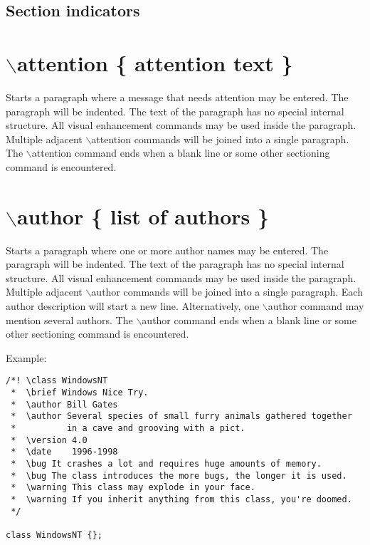 \subsection*{ Section indicators }



 \hypertarget{commands_cmdattention}{}\section{$\backslash$attention \{ attention text \}}\label{commands_cmdattention}
 Starts a paragraph where a message that needs attention may be entered. The paragraph will be indented. The text of the paragraph has no special internal structure. All visual enhancement commands may be used inside the paragraph. Multiple adjacent $\backslash$attention commands will be joined into a single paragraph. The $\backslash$attention command ends when a blank line or some other sectioning command is encountered.\hypertarget{commands_cmdauthor}{}\section{$\backslash$author \{ list of authors \}}\label{commands_cmdauthor}
 Starts a paragraph where one or more author names may be entered. The paragraph will be indented. The text of the paragraph has no special internal structure. All visual enhancement commands may be used inside the paragraph. Multiple adjacent $\backslash$author commands will be joined into a single paragraph. Each author description will start a new line. Alternatively, one $\backslash$author command may mention several authors. The $\backslash$author command ends when a blank line or some other sectioning command is encountered.

\begin{Desc}
\item[Example:]

\begin{VerbInclude}\begin{verbatim}/*! \class WindowsNT
 *  \brief Windows Nice Try.
 *  \author Bill Gates
 *  \author Several species of small furry animals gathered together 
 *          in a cave and grooving with a pict.
 *  \version 4.0
 *  \date    1996-1998
 *  \bug It crashes a lot and requires huge amounts of memory.
 *  \bug The class introduces the more bugs, the longer it is used.
 *  \warning This class may explode in your face.
 *  \warning If you inherit anything from this class, you're doomed.
 */

class WindowsNT {};
\end{verbatim}
\end{VerbInclude}
 \end{Desc}


